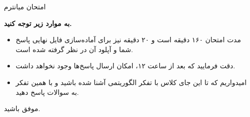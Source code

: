 
\usepackage{template/template}
\usepackage{tabularx}
\usepackage{graphicx}
\graphicspath{ {./images/} }


	\def\ci{\perp\!\!\!\perp}

	

	\header
		{امتحان میانترم}{}{}{}{}
	

	
		\textbf{به موارد زیر توجه کنید.}
		
		\begin{itemize}
			\item مدت امتحان ۱۶۰ دقیقه است و ۲۰ دقیقه نیز برای آماده‌سازی فایل نهایی پاسخ شما و آپلود آن در نظر گرفته شده است.
			\item دقت فرمایید که بعد از ساعت ۱۲، امکان ارسال پاسخ‌ها وجود نخواهد داشت.
			\item امیدواریم که تا این جای کلاس با تفکر الگوریتمی آشنا شده باشید و با همین تفکر به سوالات پاسخ دهید.
		\end{itemize}
		
	\begin{enumerate}
		\setlength{\itemsep}{30pt}

		\end{enumerate}
	\begin{flushleft}
			موفق باشید. 
	\end{flushleft}

